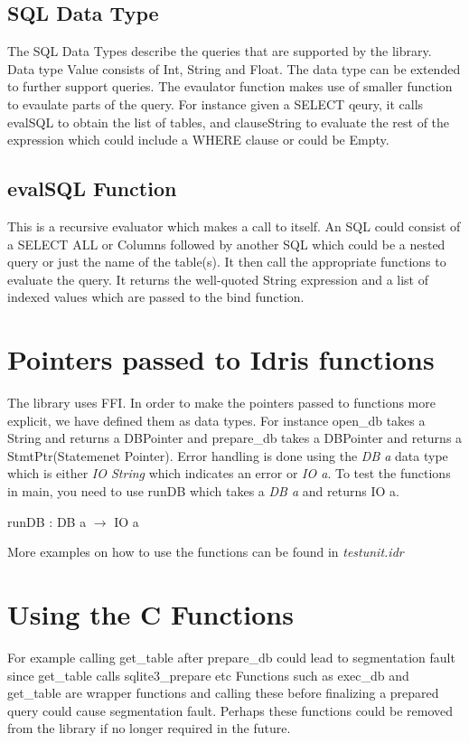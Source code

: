 \documentclass[11pt]{article}
\begin{document}
\subsection{SQL Data Type}
\label{SQL Data Type}
The SQL Data Types describe the queries that are supported by the library. Data type Value consists of Int, String and Float. The data type can be extended to further support queries. The evaulator function makes use of smaller function to evaulate parts of the query. For instance given a SELECT qeury, it calls evalSQL to obtain the list of tables, and clauseString to evaluate the rest of the expression which could include a WHERE clause or could be Empty.
\subsection{evalSQL Function}
\label{evalSQL Function}
This is a recursive evaluator which makes a call to itself. An SQL could consist of a SELECT ALL or Columns followed by another SQL which could be a nested query or just the name of the table(s). It then call the appropriate functions to evaluate the query. It returns the well-quoted String expression and a list of indexed values which are passed to the bind function.
\section{Pointers passed to Idris functions}
\label{Pointers passed to Idris functions}

The library uses FFI. In order to make the pointers passed to functions more explicit, we have defined them as data types. For instance open\_db takes a String and returns a DBPointer and prepare\_db
takes a DBPointer and returns a StmtPtr(Statemenet Pointer).
Error handling is done using the \emph {DB a} data type which is either \emph {IO String} which indicates an error or \emph{ IO a}.
To test the functions in main, you need to use runDB which takes a \emph{ DB a} and returns IO a.
\begin{center}
\centering                                           runDB : DB a $\rightarrow$ IO a
\end{center}
More examples on how to use the functions can be found in \emph{testunit.idr}

\section{Using the C Functions}
\label{Using the C Functions}

For example calling get\_table after prepare\_db could lead to segmentation fault since get\_table calls sqlite3\_prepare etc
Functions such as exec\_db and get\_table are wrapper functions and calling these before finalizing a prepared query could cause segmentation fault.
Perhaps these functions could be removed from the library if no longer required in the future.
\end{document}
